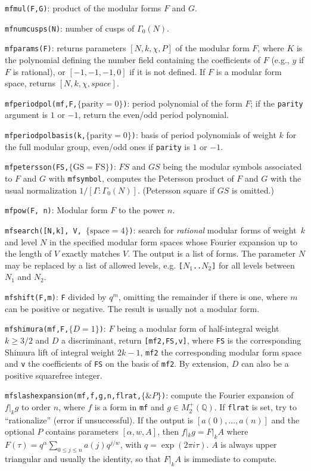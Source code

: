 \documentclass[11pt]{article}
\newcommand{\Q}{{\mathbb Q}}
\newcommand{\al}{\alpha}
\newcommand{\G}{\Gamma}
\def\kbd#1{{\tt #1}}
\begin{document}
\f\kbd{mfmul(F,G)}: product of the modular forms $F$ and $G$.

\f\kbd{mfnumcusps(N)}: number of cusps of $\G_0(N)$.

\f\kbd{mfparams(F)}: returns parameters $[N,k,\chi,P]$ of the modular form $F$,
where $K$ is the polynomial defining the number field containing the
coefficients of $F$ (e.g., $y$ if $F$ is rational), or $[-1,-1,-1,0]$ if
it is not defined. If $F$ is a modular form space, returns $[N,k,\chi,space]$.

\f\kbd{mfperiodpol(mf,F,$\{\text{parity}=0\}$)}: period polynomial of the
form $F$; if the \kbd{parity} argument is $1$ or $-1$, return the even/odd
period polynomial.

\f\kbd{mfperiodpolbasis(k,$\{\text{parity}=0\}$)}: basis of period polynomials of weight
$k$ for the full modular group, even/odd ones if \kbd{parity} is $1$ or $-1$.

\f\kbd{mfpetersson(FS,$\{\text{GS}=\text{FS}\}$)}: $FS$ and $GS$ being the modular symbols associated
to $F$ and $G$ with \kbd{mfsymbol}, computes the Petersson product of $F$ and
$G$ with the usual normalization $1/[\G:\G_0(N)]$. (Petersson square if $GS$
is omitted.)

\f\kbd{mfpow(F, n)}: Modular form $F$ to the power $n$.

\f\kbd{mfsearch([N,k], V, $\{\text{space}=4\}$)}: search for \emph{rational}
modular forms of weight~$k$ and level $N$ in the specified modular
form spaces whose Fourier expansion up to the length of $V$ exactly matches
$V$. The output is a list of forms. The parameter $N$ may be replaced
by a list of allowed levels, e.g. \kbd{[$N_1$..$N_2$]} for all levels
between $N_1$ and $N_2$.

\f\kbd{mfshift(F,m)}: \kbd{F} divided by $q^m$, omitting the remainder if there
is one, where $m$ can be positive or negative. The result is usually not
a modular form.

\f\kbd{mfshimura(mf,F,$\{D = 1\}$)}: $F$ being a modular form of
half-integral weight $k\ge3/2$ and $D$ a discriminant, return
\kbd{[mf2,FS,v]}, where \kbd{FS} is the corresponding Shimura lift of integral
weight $2k-1$, \kbd{mf2} the corresponding modular form space and \kbd{v} the
coefficients of \kbd{FS} on the basis of \kbd{mf2}. By extension, $D$ can also
be a positive squarefree integer.

\f\kbd{mfslashexpansion(mf,f,g,n,flrat,$\{\&P\}$)}: compute the Fourier
expansion of $f|_k g$ to order $n$, where $f$ is a form in \kbd{mf} and
$g\in M_2^+(\Q)$. If \kbd{flrat} is set, try to ``rationalize''
(error if unsuccessful). If the output is $[a(0),...,a(n)]$ and the
optional $P$ contains parameters $[\al,w,A]$, then $f|_k g = F|_k A$
where
$F(\tau) = q^{\al}\sum_{0\le j\le n}a(j)q^{j/w}$, with $q=\exp(2\pi i\tau)$.
$A$ is always upper triangular and usually the identity, so that $F|_k A$
is immediate to compute.
\end{document}
